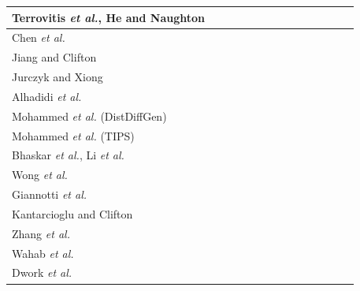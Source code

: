 \documentclass[USenglish,oneside,twocolumn]{article}
\begin{document}
\begin{table}[!t]
{\begin{tabular}{|p{5.7cm}|p{1.0cm}|p{0.7cm}|p{1.4cm}|p{1.1cm}|p{1.4cm}|p{1.1cm}|p{0.7cm}|p{0.8cm}|p{0.6cm}|p{0.8cm}|p{0.6cm}|p{1.1cm}|p{1.5cm}|}
            \cline{1-14}
            \hline\hline
            Terrovitis \emph{et al.}, He and Naughton  & \centering{$\CIRCLE$} &  &  & \centering{$\CIRCLE$} &  &  & \centering{$\CIRCLE$} &  &  &  &  &  &  \tabularnewline
            \hline
            Chen \emph{et al.} &  \centering{$\CIRCLE$} &  &  \centering{$\CIRCLE$} &  &  &  & \centering{$\CIRCLE$} &  &  &  &  &  &  \tabularnewline
            \hline
            Jiang and Clifton &  &  \centering{$\CIRCLE$} &  & \centering{$\CIRCLE$} &  &  &  &  & \centering{$\CIRCLE$} &  &  & \centering{$\Circle$} &  \tabularnewline
            \hline
            Jurczyk and Xiong &  &  \centering{$\CIRCLE$} &  & \centering{$\CIRCLE$} &  &  &  &  &  & \centering{$\CIRCLE$} &  & \centering{$\Circle$} &  \tabularnewline
            \hline
            Alhadidi \emph{et al.} &  &  \centering{$\CIRCLE$} & \centering{$\CIRCLE$} &  &  &  &  & \centering{$\CIRCLE$} &  &  &  & \centering{$\Circle$} &  \tabularnewline
            \hline
            Mohammed \emph{et al.} (DistDiffGen) &  & \centering{$\CIRCLE$} & \centering{$\CIRCLE$} &  &  &  &  &  & \centering{$\CIRCLE$} &  &  & \centering{$\Circle$} &  \tabularnewline
            \hline
            Mohammed \emph{et al.} (TIPS) &  & \centering{$\CIRCLE$} &  & \centering{$\CIRCLE$} &  &  &  &  & \centering{$\CIRCLE$} &  &  & \centering{$\CIRCLE$} &  \tabularnewline
            \hline
            Bhaskar \emph{et al.}, Li \emph{et al.} & \centering{$\CIRCLE$} &  &  &  & \centering{$\CIRCLE$} &  & \centering{$\CIRCLE$} &  &  &  &  &  &  \tabularnewline
            \hline
            Wong \emph{et al.}  & \centering{$\CIRCLE$} &  &  &  &  &  & \centering{$\CIRCLE$} &  &  &  &  & \centering{$\Circle$} &  \tabularnewline
            \hline
            Giannotti \emph{et al.} & \centering{$\CIRCLE$} &  &  &  &  & \centering{$\CIRCLE$} & \centering{$\CIRCLE$} &  &  &  &  & \centering{$\Circle$} &  \tabularnewline
            \hline
            Kantarcioglu and Clifton & \centering{$\CIRCLE$} &  &  &  &  &  &  &  &  & \centering{$\CIRCLE$} &  & \centering{$\Circle$} &  \tabularnewline
            \hline
            Zhang \emph{et al.} & \centering{$\CIRCLE$} &  &  &  &  &  &  & \centering{$\CIRCLE$} &  &  &  & \centering{$\Circle$} &  \tabularnewline
            \hline
            Wahab \emph{et al.} & \centering{$\CIRCLE$} &  &  &  & \centering{$\CIRCLE$} &  &  & \centering{$\CIRCLE$} &  & \centering{$\CIRCLE$} &  & \centering{$\Circle$} &  \tabularnewline
            \hline
            Dwork \emph{et al.} &  & \centering{$\CIRCLE$} &  &  & \centering{$\CIRCLE$} &  &  &  &  & \centering{$\CIRCLE$} &  & \centering{$\CIRCLE$} &  \tabularnewline

\end{tabular}}
\end{table}
\end{document}
